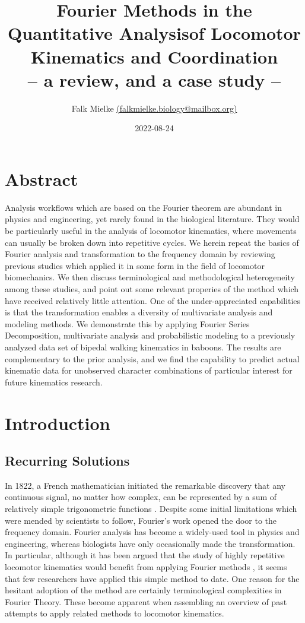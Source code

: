 \documentclass[10pt,a4paper]{article}
\author{Falk Mielke \href{mailto:falkmielke.biology@mailbox.org}{(falkmielke.biology@mailbox.org)}}
\date{2022-08-24}
\title{Fourier Methods in the Quantitative Analysis\linebreak of Locomotor Kinematics and Coordination\\\medskip
\large -- a review, and a case study --}
\begin{document}
\maketitle

\section{Abstract}
\label{sec:orgaa6032a}
Analysis workflows which are based on the Fourier theorem are abundant in physics and engineering, yet rarely found in the biological literature.
They would be particularly useful in the analysis of locomotor kinematics, where movements can usually be broken down into repetitive cycles.
We herein repeat the basics of Fourier analysis and transformation to the frequency domain by reviewing previous studies which applied it in some form in the field of locomotor biomechanics.
We then discuss terminological and methodological heterogeneity among these studies, and point out some relevant properies of the method which have received relatively little attention.
One of the under-appreciated capabilities is that the transformation enables a diversity of multivariate analysis and modeling methods.
We demonstrate this by applying Fourier Series Decomposition, multivariate analysis and probabilistic modeling to a previously analyzed data set of bipedal walking kinematics in baboons.
The results are complementary to the prior analysis, and we find the capability to predict actual kinematic data for unobserved character combinations of particular interest for future kinematics research.


\FloatBarrier\clearpage
\tableofcontents

\FloatBarrier\clearpage
\section{Introduction}
\label{intro}

\subsection{Recurring Solutions}
\label{sec:org9c3e728}
In 1822, a French mathematician initiated the remarkable discovery that any continuous signal, no matter how complex, can be represented by a sum of relatively simple trigonometric functions \citep{Fourier1822}.
Despite some initial limitations which were mended by scientists to follow, Fourier's work opened the door to the frequency domain.
Fourier analysis has become a widely-used tool in physics and engineering, whereas biologists have only occasionally made the transformation.
In particular, although it has been argued that the study of highly repetitive locomotor kinematics would benefit from applying Fourier methods \citep{Schneider1983,Pike2002,Skejo2021,Webb2007,Mielke2019}, it seems that few researchers have applied this simple method to date.
One reason for the hesitant adoption of the method are certainly terminological complexities in Fourier Theory.
These become apparent when assembling an overview of past attempts to apply related methods to locomotor kinematics.
\end{document}
